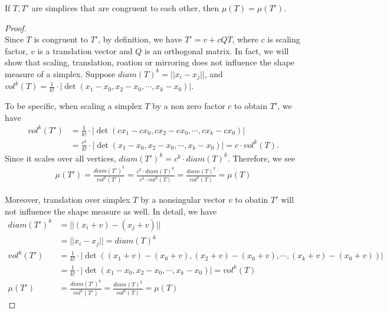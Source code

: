     \begin{lemma*}
    If $T, T'$ are simplices that are congruent to each other, then $\mu(T) = \mu(T')$.
    \end{lemma*}
    \begin{proof}\mbox{}\\
    Since $T$ is congruent to $T'$, by definition, we have $T' = v + cQT$, where $c$ is scaling factor, $v$ is a translation vector and $Q$ is an orthogonal matrix. In fact, we will show that scaling, translation, roation or mirroring does not influence the shape measure of a simplex. 
    Suppose $diam(T)^k = ||x_i - x_j ||$, and $vol^k(T) = \frac{1}{k!}\cdot|\det(x_1-x_0, x_2-x_0,\cdots, x_k-x_0)|$.
    
    To be specific, when scaling a simplex $T$ by a non zero factor $c$ to obtain $T'$, we have 
    \begin{align*}
     vol^k(T') &= \frac{1}{k!}\cdot|\det(cx_1-cx_0, cx_2-cx_0,\cdots, cx_k-cx_0)| \\
               &= \frac{c^k}{k!}\cdot|\det(x_1-x_0, x_2-x_0,\cdots, x_k-x_0)| = c\cdot vol^k(T).
    \end{align*}
    Since it scales over all vertices, $diam(T')^k = c^k\cdot diam(T)^k$. Therefore, we see
    \begin{align*}
    \mu(T') = \frac{diam(T')^k}{vol^k(T')} = \frac{c^k\cdot diam(T)^k}{c^k\cdot vol^k(T)} = \frac{diam(T)^k}{vol^k(T)} = \mu(T)
    \end{align*}

    Moreover, translation over simplex $T$ by a nonsingular vector $v$ to obatin $T'$ will not influence the shape measure as well. In detail, we have
    \begin{align*}
    diam(T')^k &= ||(x_i + v) - (x_j + v)|| \\ 
               &= ||x_i - x_j|| = diam(T)^k \\
    vol^k(T') &= \frac{1}{k!}\cdot|\det((x_1+v) - (x_0+v), (x_2+v)-(x_0+v),\cdots,(x_k+v)-(x_0+v))|\\
              &= \frac{1}{k!}\cdot|\det(x_1-x_0, x_2-x_0,\cdots, x_k-x_0)| = vol^k(T)\\
    \mu(T') &= \frac{diam(T')^k}{vol^k(T')} = \frac{diam(T)^k}{vol^k(T)} = \mu(T)
    \end{align*}


\end{proof}
